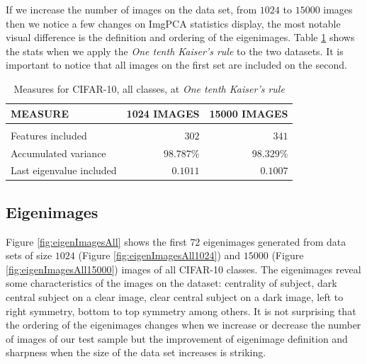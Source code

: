 \documentclass{article} %
\begin{document}
If we increase the number of images on the data set, from $1024$ to $15000$ images then we notice a few changes on ImgPCA statistics display, the most notable visual difference is the definition and ordering of the eigenimages. Table \ref{tab:ImgPCAcomputations} shows the stats when we apply the \emph{One tenth Kaiser's rule} to the two datasets. It is important to notice that all images on the first set are included on the second.

\begin{table}[h]
\caption{Measures for CIFAR-10, all classes, at \emph{One tenth Kaiser's rule}}
\label{tab:ImgPCAcomputations}
\begin{center}
\begin{tabular}{lrr}
\multicolumn{1}{l}{\bf MEASURE}  &\multicolumn{1}{r}{\bf 1024 IMAGES}&\multicolumn{1}{r}{\bf 15000 IMAGES}
\\ \hline \\
Features included       &$302$ & $341$\\
Accumulated variance             &$98.787$\% & $98.329$\%\\
Last eigenvalue included&$0.1011$&$0.1007$\\
\end{tabular}
\end{center}
\end{table}

\subsection{Eigenimages}
Figure \ref{fig:eigenImagesAll} shows the first $72$ eigenimages generated from data sets of size $1024$ (Figure \ref{fig:eigenImagesAll1024}) and $15000$ (Figure \ref{fig:eigenImagesAll15000}) images of all CIFAR-10 classes. The eigenimages reveal some characteristics of the images on the dataset: centrality of subject, dark central subject on a clear image, clear central subject on a dark image, left to right symmetry, bottom to top symmetry among others. It is not surprising that the ordering of the eigenimages changes when we increase or decrease the number of images of our test sample but the improvement of eigenimage definition and sharpness when the size of the data set increases is striking.
\end{document}
